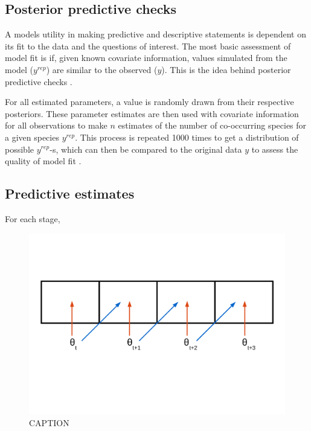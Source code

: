 \documentclass[12pt,letterpaper]{article}
\begin{document}
\subsection{Posterior predictive checks}

A models utility in making predictive and descriptive statements is dependent on its fit to the data and the questions of interest. The most basic assessment of model fit is if, given known covariate information, values simulated from the model (\(y^{rep}\)) are similar to the observed (\(y\)). This is the idea behind posterior predictive checks \citep{Gelman2013d}. 

For all estimated parameters, a value is randomly drawn from their respective posteriors. These parameter estimates are then used with covariate information for all observations to make \(n\) estimates of the number of co-occurring species for a given species \(y^{rep}\). This process is repeated 1000 times to get a distribution of possible \(y^{rep}\)-s, which can then be compared to the original data \(y\) to assess the quality of model fit \citep{Gelman2013d}.


\subsection{Predictive estimates}

For each stage, 


\begin{figure}[ht]
  \centering
  \includegraphics[height = 0.5\textheight, width = \textwidth, keepaspectratio = true]{figure/predict_perform}
  \caption{CAPTION}
  \label{fig:concept}
\end{figure}
\end{document}
